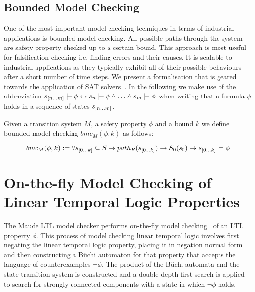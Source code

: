 \subsection*{Bounded Model Checking}
One of the most important model checking techniques in terms of industrial applications is bounded model checking. All possible paths through the system are safety property checked up to a certain bound. This approach is most useful for falsification checking i.e. finding errors and their causes. It is scalable to industrial applications as they typically exhibit all of their possible behaviours after a short number of time steps. We present a formalisation that is geared towards the application of SAT solvers~\cite{EC01}. In the following we make use of the abbreviation $s_{{[}n \ldots m {]}} \models \phi \leftrightarrow s_n \models \phi \wedge \ldots \wedge  s_m \models \phi$ when writing that a formula $\phi$ holds in a sequence of states $s_{{[}n \ldots m {]}}$.
\medskip
\begin{mydef}
Given a transition system $M$, a safety property $\phi$ and a bound $k$ we define bounded model checking $bmc_M(\phi,k)$ as follows:

$$bmc_M(\phi,k):= \forall s_{{[}0 \ldots k {]}} \subseteq S \to  path_R(s_{{[}0 \ldots k {]}}) \to S_0(s_0) \to s_{{[}0 \ldots k {]}} \models \phi$$
\end{mydef}
\medskip
\begin{comment}
\textbf{Note to self: I need to add something on loop freedom and inclusion checking for sat based model checking, I also need to describe the LTL model checker in Maude which uses Buchi automaton.}  
\end{comment}
\section{On-the-fly Model Checking of Linear Temporal Logic Properties}
The Maude LTL model checker performs on-the-fly model checking~\cite{CC91} of an LTL property $\phi$.
This process of model checking linear temporal logic involves first  negating the linear temporal  logic property, placing it in negation normal form and then constructing a B{\"u}chi automaton for that property that accepts the language of counterexamples $\neg \phi$. The product of the B{\"u}chi automata and the state transition system is constructed and a double depth first search is applied to search for strongly connected components with a state in which $\neg \phi$ holds.

